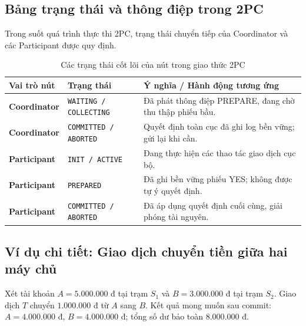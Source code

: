 \documentclass[12pt,a4paper]{report}
\begin{document}
\subsection{Bảng trạng thái và thông điệp trong 2PC}
Trong suốt quá trình thực thi 2PC, trạng thái chuyển tiếp của Coordinator và các Participant được quy định.

\begin{table}[H]
\centering
\small
\label{tab:2pc_states}
\renewcommand{\arraystretch}{1.2}
\begin{tabularx}{\textwidth}{|>{\raggedright\arraybackslash\bfseries}p{3cm}|>{\raggedright\arraybackslash}p{4cm}|>{\raggedright\arraybackslash}X|}
    \hline
    \textbf{Vai trò nút} & \textbf{Trạng thái} & \textbf{Ý nghĩa / Hành động tương ứng} \\ \hline
    Coordinator & \texttt{WAITING / COLLECTING} & Đã phát thông điệp PREPARE, đang chờ thu thập phiếu bầu. \\ \hline
    Coordinator & \texttt{COMMITTED / ABORTED} & Quyết định toàn cục đã ghi log bền vững; gửi lại khi cần. \\ \hline
    Participant & \texttt{INIT / ACTIVE} & Đang thực hiện các thao tác giao dịch cục bộ. \\ \hline
    Participant & \texttt{PREPARED} & Đã ghi bền vững phiếu YES; không được tự ý quyết định. \\ \hline
    Participant & \texttt{COMMITTED / ABORTED} & Đã áp dụng quyết định cuối cùng, giải phóng tài nguyên. \\ \hline
\end{tabularx}
\caption{Các trạng thái cốt lõi của nút trong giao thức 2PC}
\end{table}

\subsection{Ví dụ chi tiết: Giao dịch chuyển tiền giữa hai máy chủ}
Xét tài khoản $A = 5.000.000$ đ tại trạm $S_1$ và $B = 3.000.000$ đ tại trạm $S_2$. Giao dịch $T$ chuyển $1.000.000$ đ từ $A$ sang $B$. Kết quả mong muốn sau commit: $A = 4.000.000$ đ, $B = 4.000.000$ đ; tổng số dư bảo toàn $8.000.000$ đ.
\end{document}
